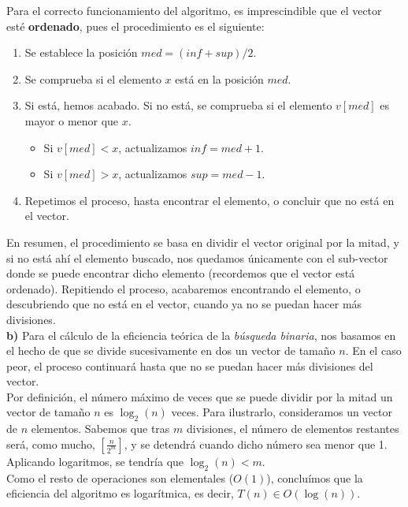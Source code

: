\documentclass[11pt,a4paper]{article}
\begin{document}
Para el correcto funcionamiento del algoritmo, es imprescindible que el vector esté \textbf{ordenado}, pues el procedimiento es el siguiente:

\begin{enumerate}
\item Se establece la posición $med = (inf+sup)/2$.
\item Se comprueba si el elemento $x$ está en la posición $med$.
\item Si está, hemos acabado. Si no está, se comprueba si el elemento $v[med]$ es mayor o menor que $x$.\\

    \begin{itemize}
    \item Si $v[med] < x$, actualizamos $inf = med + 1$.
    \item Si $v[med] > x$, actualizamos $sup = med - 1$.
    \end{itemize}
\item Repetimos el proceso, hasta encontrar el elemento, o concluir que no está en el vector.
\end{enumerate}

En resumen, el procedimiento se basa en dividir el vector original por la mitad, y si no está ahí el elemento buscado, nos quedamos únicamente con el sub-vector donde se puede encontrar dicho elemento (recordemos que el vector está ordenado). Repitiendo el proceso, acabaremos encontrando el elemento, o descubriendo que no está en el vector, cuando ya no se puedan hacer más divisiones.\\

\textbf{b)} Para el cálculo de la eficiencia teórica de la \textit{búsqueda binaria}, nos basamos en el hecho de que se divide sucesivamente en dos un vector de tamaño $n$. En el caso peor, el proceso continuará hasta que no se puedan hacer más divisiones del vector.\\

Por definición, el número máximo de veces que se puede dividir por la mitad un vector de tamaño $n$ es $\log_2 (n)$ veces. Para ilustrarlo, consideramos un vector de $n$ elementos. Sabemos que tras $m$ divisiones, el número de elementos restantes será, como mucho, $\left[\frac{n}{2^m}\right]$, y se detendrá cuando dicho número sea menor que 1. Aplicando logaritmos, se tendría que $\log_2 (n) < m$.\\

Como el resto de operaciones son elementales ($O(1)$), concluímos que la eficiencia del algoritmo es logarítmica, es decir, $T(n) \in O(\log (n))$.\\
\end{document}
